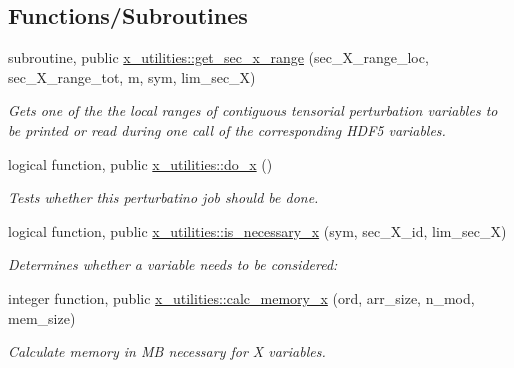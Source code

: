 \subsection*{Functions/\+Subroutines}
\begin{DoxyCompactItemize}
\item 
subroutine, public \hyperlink{namespacex__utilities_a6072ddd1fd230758795ff320c75a1f6a}{x\+\_\+utilities\+::get\+\_\+sec\+\_\+x\+\_\+range} (sec\+\_\+\+X\+\_\+range\+\_\+loc, sec\+\_\+\+X\+\_\+range\+\_\+tot, m, sym, lim\+\_\+sec\+\_\+X)
\begin{DoxyCompactList}\small\item\em Gets one of the the local ranges of contiguous tensorial perturbation variables to be printed or read during one call of the corresponding H\+D\+F5 variables. \end{DoxyCompactList}\item 
logical function, public \hyperlink{namespacex__utilities_adef8eab82f0fd670a7795c754cf9a8f9}{x\+\_\+utilities\+::do\+\_\+x} ()
\begin{DoxyCompactList}\small\item\em Tests whether this perturbatino job should be done. \end{DoxyCompactList}\item 
logical function, public \hyperlink{namespacex__utilities_a689aca7fedb49c43c5a65a18d557259f}{x\+\_\+utilities\+::is\+\_\+necessary\+\_\+x} (sym, sec\+\_\+\+X\+\_\+id, lim\+\_\+sec\+\_\+X)
\begin{DoxyCompactList}\small\item\em Determines whether a variable needs to be considered\+: \end{DoxyCompactList}\item 
integer function, public \hyperlink{namespacex__utilities_a4d18921da77463d069346f1c7322b451}{x\+\_\+utilities\+::calc\+\_\+memory\+\_\+x} (ord, arr\+\_\+size, n\+\_\+mod, mem\+\_\+size)
\begin{DoxyCompactList}\small\item\em Calculate memory in MB necessary for X variables. \end{DoxyCompactList}\end{DoxyCompactItemize}
